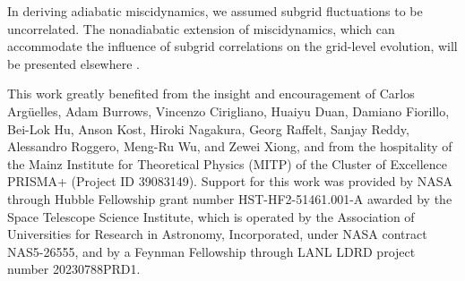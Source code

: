 \documentclass[aps,prd,twocolumn,groupedaddress,preprintnumbers]{revtex4-2}
\begin{document}
In deriving adiabatic miscidynamics, we assumed subgrid fluctuations to be uncorrelated. The nonadiabatic extension of miscidynamics, which can accommodate the influence of subgrid correlations on the grid-level evolution, will be presented elsewhere \cite{johns2025local}.
























\begin{acknowledgments}
This work greatly benefited from the insight and encouragement of Carlos Arg\"{u}elles, Adam Burrows, Vincenzo Cirigliano, Huaiyu Duan, Damiano Fiorillo, Bei-Lok Hu, Anson Kost, Hiroki Nagakura, Georg Raffelt, Sanjay Reddy, Alessandro Roggero, Meng-Ru Wu, and Zewei Xiong, and from the hospitality of the Mainz Institute for Theoretical Physics (MITP) of the Cluster of Excellence PRISMA+ (Project ID 39083149). Support for this work was provided by NASA through Hubble Fellowship grant number HST-HF2-51461.001-A awarded by the Space Telescope Science Institute, which is operated by the Association of Universities for Research in Astronomy, Incorporated, under NASA contract NAS5-26555, and by a Feynman Fellowship through LANL LDRD project number 20230788PRD1.
\end{acknowledgments}





\end{document}

